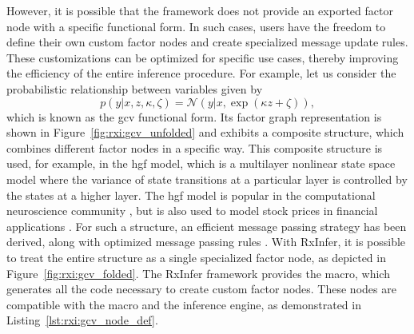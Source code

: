 However, it is possible that the framework does not provide an exported factor node with a
specific functional form.
In such cases, users have the freedom to define their own custom factor nodes and create
specialized message update rules.
These customizations can be optimized for specific use cases, thereby improving the efficiency
of the entire inference procedure.
For example, let us consider the probabilistic relationship between variables given by
\begin{equation}
    \label{eq:rxi:gcv} p(y|x, z, \kappa, \zeta) = \mathcal{N}(y|x, \exp(\kappa z
    + \zeta)),
  \end{equation} which is known as the \ac{gcv} functional form.
Its factor graph representation is shown in Figure~\ref{fig:rxi:gcv_unfolded} and exhibits a composite structure, which combines different factor nodes in a specific way.
This composite structure is used, for example, in the \ac{hgf}
model, which is a multilayer nonlinear state space model where the variance of state
transitions at a particular layer is controlled by the states at a higher layer.
The \ac{hgf} model is popular in the computational neuroscience community
\citep{mathys_hierarchical_2012, iglesias_hierarchical_2013, mathys_bayesian_2011,
  mathys_uncertainty_2014}, but is also used to model stock prices in financial applications
\citep{senoz_switching_2021}.
For such a structure, an efficient message passing strategy has been derived, along with
optimized message passing rules \citep{senoz_online_2020}.
With RxInfer, it is possible to treat the entire structure as a single specialized factor
node, as depicted in Figure~\ref{fig:rxi:gcv_folded}.
The RxInfer framework provides the  macro, which generates all the code necessary
to create custom factor nodes.
These nodes are compatible with the  macro and the inference engine, as
demonstrated in Listing~\ref{lst:rxi:gcv_node_def}.
\begin{figure*}[h!]
  \begin{adjustbox}{minipage=\textwidth,margin=0pt \smallskipamount,center}
  \end{adjustbox}
\end{figure*}

